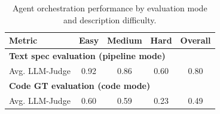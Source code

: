 \begin{table}[!h]
\centering
\caption{Agent orchestration performance by evaluation mode and description difficulty.}
\label{tab:agent-orchestration-results-vertical}

\setlength{\tabcolsep}{6pt}
\renewcommand{\arraystretch}{1.15}
\small

\begin{tabular}{lcccc}
\toprule
\textbf{Metric} & \textbf{Easy} & \textbf{Medium} & \textbf{Hard} & \textbf{Overall} \\
\midrule

\multicolumn{5}{l}{\textbf{Text spec evaluation (pipeline mode)}}\\
\midrule
Avg. LLM-Judge & 0.92 & 0.86 & 0.60 & 0.80 \\
\midrule

\multicolumn{5}{l}{\textbf{Code GT evaluation (code mode)}}\\
\midrule
Avg. LLM-Judge & 0.60 & 0.59 & 0.23 & 0.49 \\
\bottomrule
\end{tabular}
\end{table}